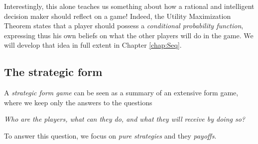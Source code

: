 Interestingly, this alone teaches us something about how a rational and intelligent decision maker should reflect on a game! Indeed, the Utility Maximization Theorem states that a player should possess a \emph{conditional probability function}, expressing thus his own beliefs on what the other players will do in the game. We will develop that idea in full extent in Chapter \ref{chap:Seq}.
\subsection{The strategic form}
\label{subsec:StratForm}

A \emph{strategic form game} can be seen as a summary of an extensive form game, where we keep only the answers to the questions
\begin{center}
\textit{Who are the players, what can they do, and what they will receive by doing so?}
\end{center}

To answer this question, we focus on \emph{pure strategies} and they \emph{payoffs}.


